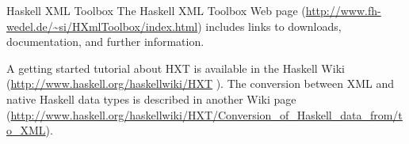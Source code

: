 \begin{hcarentry}[updated]{Haskell XML Toolbox}
\FurtherReading
The Haskell XML Toolbox Web page
(\url{http://www.fh-wedel.de/~si/HXmlToolbox/index.html})
includes links to downloads,  documentation, and further information.

A getting started tutorial about HXT is available
 in the Haskell Wiki (\url{http://www.haskell.org/haskellwiki/HXT}
). The conversion between XML and native Haskell data types is
described in another Wiki page
(\url{http://www.haskell.org/haskellwiki/HXT/Conversion_of_Haskell_data_from/to_XML}).
\end{hcarentry}

